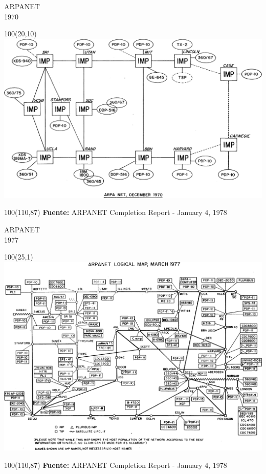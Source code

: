 \documentclass[aspectratio=169]{beamer}
\begin{document}
\begin{frame}[fragile,t]{ARPANET\\ 1970}
    \begin{textblock}{100}(20,10)
    \includegraphics[scale=0.14]{img/arpanet1970.png}\\
    \end{textblock}
    \begin{textblock}{100}(110,87)
    \tiny \textbf{Fuente:} ARPANET Completion Report - January 4, 1978
    \end{textblock}
\end{frame}

\begin{frame}[fragile,t]{ARPANET\\ 1977}
    \begin{textblock}{100}(25,1)
    \includegraphics[scale=0.122]{img/arpanet1977.png}\\
    \end{textblock}
    \begin{textblock}{100}(110,87)
    \tiny \textbf{Fuente:} ARPANET Completion Report - January 4, 1978
    \end{textblock}
\end{frame}
\end{document}
